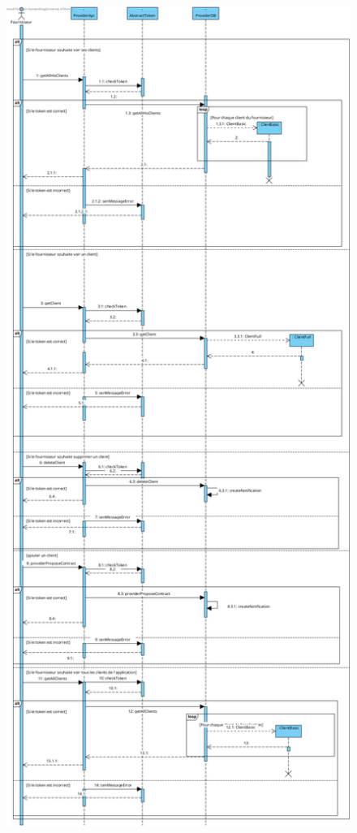 \newpage
\begin{figure}[h]
    \centering
    \includegraphics[width = 1\textwidth]{Base/sequence/img/fournisseur/voir_ses_clients.png}
\end{figure}
\newpage
